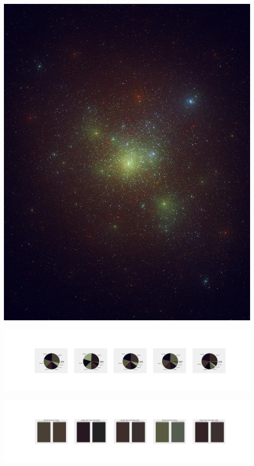 \documentclass[11pt]{article}
\begin{document}
\begin{landscape}
    \begin{center}
    \includegraphics[width=\textwidth]{./nbimg/file (126).jpg}
    \end{center}

    \begin{center}
    \includegraphics[width=250mm]{./nbimg/pie-30.jpg}
    \end{center}

    \begin{center}
    \includegraphics[width=250mm]{./nbimg/peak-30.jpg}
    \end{center}
    


\end{landscape}
\end{document}
